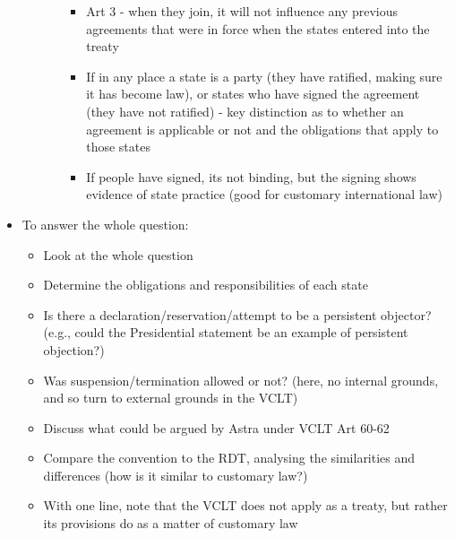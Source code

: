 \begin{itemize}
\begin{itemize}
\begin{itemize}
\begin{itemize}
                \item Art 3 - when they join, it will not influence any previous agreements that were in force when the states entered into the treaty
                \item If in any place a state is a party (they have ratified, making sure it has become law), or states who have signed the agreement (they have not ratified) - key distinction as to whether an agreement is applicable or not and the obligations that apply to those states
                \item If people have signed, its not binding, but the signing shows evidence of state practice (good for customary international law)                
            \end{itemize}       
        \end{itemize}
    \end{itemize}
    \item To answer the whole question:
    \begin{itemize}
        \item Look at the whole question
        \item Determine the obligations and responsibilities of each state
        \item Is there a declaration/reservation/attempt to be a persistent objector? (e.g., could the Presidential statement be an example of persistent objection?)
        \item Was suspension/termination allowed or not? (here, no internal grounds, and so turn to external grounds in the VCLT)
        \item Discuss what could be argued by Astra under VCLT Art 60-62
        \item Compare the convention to the RDT, analysing the similarities and differences (how is it similar to customary law?)
        \item With one line, note that the VCLT does not apply as a treaty, but rather its provisions do as a matter of customary law
    \end{itemize}
\end{itemize}

